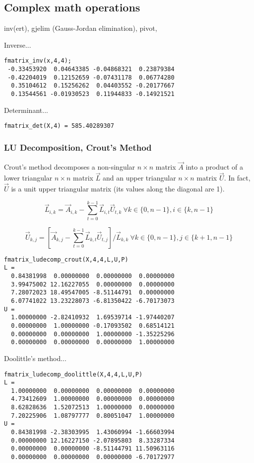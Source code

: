 \subsection{Complex math operations}
\label{module:matrix:complex}
inv(ert), gjelim (Gauss-Jordan elimination), pivot,

Inverse...
\begin{verbatim}
fmatrix_inv(x,4,4);
 -0.33453920  0.04643385 -0.04868321  0.23879384
 -0.42204019  0.12152659 -0.07431178  0.06774280
  0.35104612  0.15256262  0.04403552 -0.20177667
  0.13544561 -0.01930523  0.11944833 -0.14921521
\end{verbatim}

Determinant...
\begin{verbatim}
fmatrix_det(X,4) = 585.40289307
\end{verbatim}

\subsubsection{LU Decomposition, Crout's Method}
Crout's method decomposes a non-singular $n\times n$ matrix $\vec{A}$ into a
product of a lower triangular $n \times n$ matrix $\vec{L}$ and an upper
triangular $n \times n$ matrix $\vec{U}$. %
In fact, $\vec{U}$ is a unit upper triangular matrix (its values along the
diagonal are 1).

\[
    \vec{L}_{i,k} = \vec{A}_{i,k} -
                    \sum_{t=0}^{k-1}{ \vec{L}_{i,t} \vec{U}_{t,k} }
                    \ \forall k \in \{0,n-1\}, i \in \{k,n-1\}
\]

\[
    \vec{U}_{k,j} = \left[
                    \vec{A}_{k,j} -
                    \sum_{t=0}^{k-1}{ \vec{L}_{k,t} \vec{U}_{t,j} }
                    \right] / \vec{L}_{k,k}
                    \ \forall k \in \{0,n-1\}, j \in \{k+1,n-1\}
\]

\begin{verbatim}
fmatrix_ludecomp_crout(X,4,4,L,U,P)
L =
  0.84381998  0.00000000  0.00000000  0.00000000
  3.99475002 12.16227055  0.00000000  0.00000000
  7.28072023 18.49547005 -8.51144791  0.00000000
  6.07741022 13.23228073 -6.81350422 -6.70173073
U =
  1.00000000 -2.82410932  1.69539714 -1.97440207
  0.00000000  1.00000000 -0.17093502  0.68514121
  0.00000000  0.00000000  1.00000000 -1.35225296
  0.00000000  0.00000000  0.00000000  1.00000000
\end{verbatim}

Doolittle's method...
\begin{verbatim}
fmatrix_ludecomp_doolittle(X,4,4,L,U,P)
L =
  1.00000000  0.00000000  0.00000000  0.00000000
  4.73412609  1.00000000  0.00000000  0.00000000
  8.62828636  1.52072513  1.00000000  0.00000000
  7.20225906  1.08797777  0.80051047  1.00000000
U =
  0.84381998 -2.38303995  1.43060994 -1.66603994
  0.00000000 12.16227150 -2.07895803  8.33287334
  0.00000000  0.00000000 -8.51144791 11.50963116
  0.00000000  0.00000000  0.00000000 -6.70172977
\end{verbatim}

